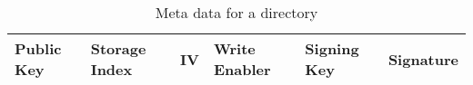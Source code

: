 \begin{table}
  \centering
  \caption{Meta data for a directory}
  \begin{tabular}{ | l | l | l | l | l | l |}
    \hline
    Public Key & Storage Index & \acs{IV} & Write Enabler &  Signing Key  &  Signature  \\
    \hline
  \end{tabular}
  \label{tbl:folder:meta}
\end{table}
